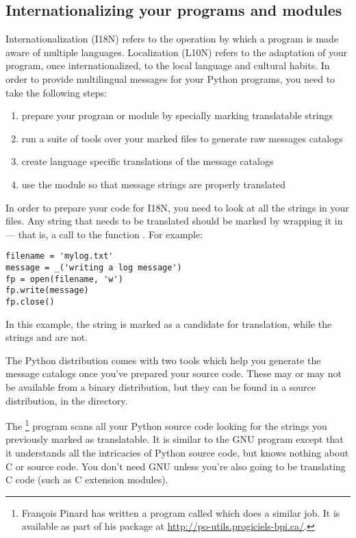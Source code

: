 \subsection{Internationalizing your programs and modules}
Internationalization (I18N) refers to the operation by which a program
is made aware of multiple languages.  Localization (L10N) refers to
the adaptation of your program, once internationalized, to the local
language and cultural habits.  In order to provide multilingual
messages for your Python programs, you need to take the following
steps:

\begin{enumerate}
    \item prepare your program or module by specially marking
          translatable strings
    \item run a suite of tools over your marked files to generate raw
          messages catalogs
    \item create language specific translations of the message catalogs
    \item use the  module so that message strings are
          properly translated
\end{enumerate}

In order to prepare your code for I18N, you need to look at all the
strings in your files.  Any string that needs to be translated
should be marked by wrapping it in  --- that is, a call
to the function \function{_()}.  For example:

\begin{verbatim}
filename = 'mylog.txt'
message = _('writing a log message')
fp = open(filename, 'w')
fp.write(message)
fp.close()
\end{verbatim}

In this example, the string  is marked as
a candidate for translation, while the strings  and
 are not.

The Python distribution comes with two tools which help you generate
the message catalogs once you've prepared your source code.  These may
or may not be available from a binary distribution, but they can be
found in a source distribution, in the  directory.

The \footnote{Fran\c cois Pinard has
written a program called
 which does a similar job.  It is available as part of
his  package at
\url{http://po-utils.progiciels-bpi.ca/}.} program
scans all your Python source code looking for the strings you
previously marked as translatable.  It is similar to the GNU
 program except that it understands all the
intricacies of Python source code, but knows nothing about C or \Cpp
source code.  You don't need GNU  unless you're also
going to be translating C code (such as C extension modules).

